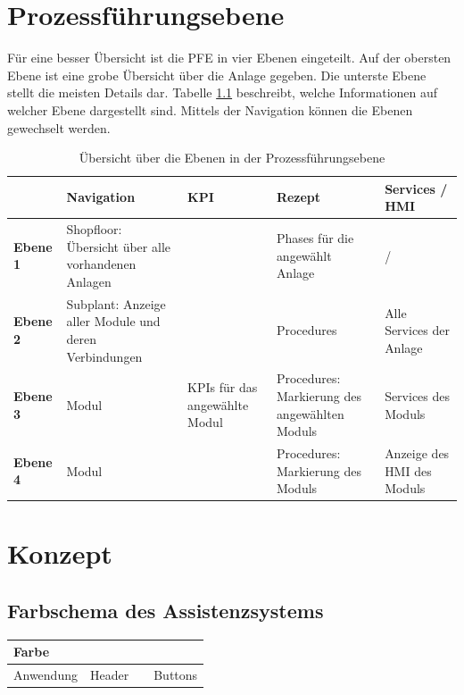 \chapter{Prozessführungsebene}
\label{A:PFE}
Für eine besser Übersicht ist die PFE in vier Ebenen eingeteilt. Auf der obersten Ebene ist eine grobe Übersicht über die Anlage gegeben. Die unterste Ebene stellt die meisten Details dar. Tabelle \ref{tab:Ebenen-PFE} beschreibt, welche Informationen auf welcher Ebene dargestellt sind. Mittels der Navigation können die Ebenen gewechselt werden.
\begin{table}[htbp]
\caption{Übersicht über die Ebenen in der Prozessführungsebene}
\centering
\begin{tabular}{p{}|p{}|p{}|p{}|p{}|}
 & \textbf{Navigation} & \textbf{KPI} & \textbf{Rezept} & \textbf{Services / HMI} \\
\hline
\textbf{Ebene 1} & Shopfloor: Übersicht über alle vorhandenen Anlagen & & Phases für die angewählt Anlage & / \\
\hline
\textbf{Ebene 2} & Subplant: Anzeige aller Module und deren Verbindungen &  & Procedures & Alle Services der Anlage \\
\hline
\textbf{Ebene 3} & Modul & KPIs für das angewählte Modul & Procedures: Markierung des angewählten Moduls & Services des Moduls \\
\hline \textbf{Ebene 4} & Modul & & Procedures: Markierung des Moduls & Anzeige des HMI des Moduls \\
\hline
\end{tabular}
\label{tab:Ebenen-PFE}
\end{table}

\chapter{Konzept}
\section{Farbschema des Assistenzsystems}
\label{A:Farbschema-Assistenz}
\begin{table}[htb]
\begin{tabular}{l|l|l|l|}
Farbe & \cellcolor{darkgreen}{\color{white}689F38} & \cellcolor{green}{\color{white}689F38} &  \cellcolor{lightgreen}{689F38}\\
\hline
Anwendung & Header & & Buttons\\
\end{tabular}
\end{table}

